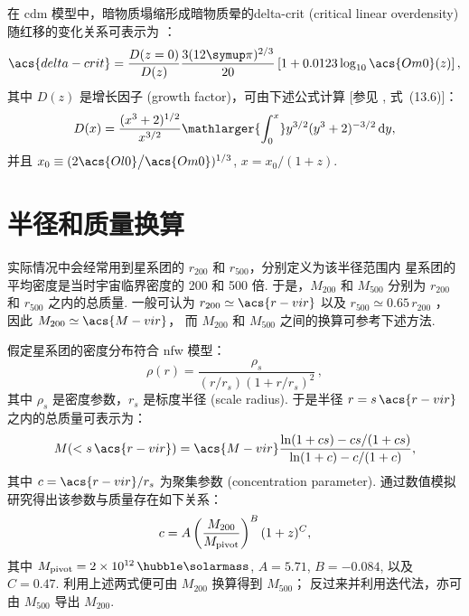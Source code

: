 在 \ac{cdm} 模型中，暗物质塌缩形成暗物质晕的\acl{delta-crit}
(critical linear overdensity)
随红移的变化关系可表示为 \cite{kitayama1996,randall2002}：
\begin{equation}
  \label{eq:delta-crit}
  \acs{delta-crit} = \frac{D(z=0)}{D(z)}
    \frac{3 (12\Cpi)^{2/3}}{20}
    \left[1 + 0.0123 \log_{10} \acs{Om0}(z) \right] ,
\end{equation}
其中 $D(z)$ 是增长因子 (growth factor)，可由下述公式计算
[参见 , 式~(13.6)]：
\begin{equation}
  \label{eq:growth-factor}
  D(x) = \frac{(x^3 + 2)^{1/2}}{x^{3/2}}
    \mathlarger{\int_0^x} y^{3/2} (y^3 + 2)^{-3/2} \,\D{y} ,
\end{equation}
并且 $x_0 \equiv (2 \acs{Ol0} \big/ \acs{Om0})^{1/3}$,
$x = x_0 \big/ (1+z)$.


\section{半径和质量换算}
\label{sec:r-m-conv}

实际情况中会经常用到星系团的 $r_{200}$ 和 $r_{500}$，分别定义为该半径范围内
星系团的平均密度是当时宇宙临界密度的 200 和 500 倍.
于是，$M_{200}$ 和 $M_{500}$ 分别为 $r_{200}$ 和 $r_{500}$ 之内的总质量.
一般可认为 $r_{200} \simeq \acs{r-vir}$
以及 $r_{500} \simeq 0.65 \, r_{200}$ \cite{ettori2009}，
因此 $M_{200} \simeq \acs{M-vir}$，
而 $M_{200}$ 和 $M_{500}$ 之间的换算可参考下述方法.

假定星系团的密度分布符合 \ac{nfw} 模型\cite{navarro1997}：
\begin{equation}
  \label{eq:nfw}
  \rho(r) = \frac{\rho_s}{
    (r / r_s) (1 + r / r_s)^2} \,,
\end{equation}
其中 $\rho_s$ 是密度参数，$r_s$ 是标度半径 (scale radius).
于是半径 $r = s \,\acs{r-vir}$ 之内的总质量可表示为\cite{lokas2001}：
\begin{equation}
  \label{eq:mass-r}
  M(< s \,\acs{r-vir}) = \acs{M-vir}
    \frac{\ln(1 + c s) - c s / (1 + c s)}{\ln(1 + c) - c / (1 + c)} ,
\end{equation}
其中 $c = \acs{r-vir} / r_s$ 为聚集参数 (concentration parameter).
 通过数值模拟研究得出该参数与质量存在如下关系：
\begin{equation}
  \label{eq:mass-c}
  c = A \left( \frac{M_{200}}{M_{\mathrm{pivot}}} \right)^B (1+z)^C ,
\end{equation}
其中 $M_{\R{pivot}} = \SI{2e12}{\per\hubble\solarmass}$,
$A = 5.71$, $B = -0.084$, 以及 $C = 0.47$.
利用上述两式便可由 $M_{200}$ 换算得到 $M_{500}$；
反过来并利用迭代法，亦可由 $M_{500}$ 导出 $M_{200}$.


